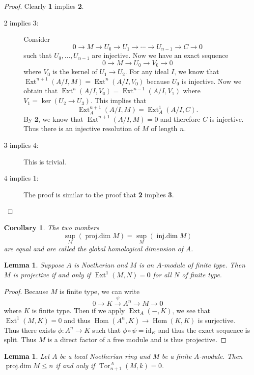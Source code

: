 \documentclass[leqno, openany]{memoir}
\newtheorem{cor}[thm]{Corollary}
\newtheorem{lem}[thm]{Lemma}
\theoremstyle{definition}
\theoremstyle{remark}
\theoremstyle{plain}
\theoremstyle{definition}
\theoremstyle{remark}
\newcommand{\mr}[1]{\mathrm{#1}}
\DeclareMathOperator{\Hom}{Hom}
\DeclareMathOperator{\Ext}{Ext}
\DeclareMathOperator{\Tor}{Tor}
\begin{document}
\begin{proof}
    Clearly \textbf{1} implies \textbf{2}.
    \begin{description}
        \item[2 implies 3:] Consider 
            \[ 0 \to M \to U_0 \to U_1 \to \cdots \to U_{n-1} \to C \to 0 \]
            such that $U_0, \ldots, U_{n-1}$ are injective. Now we have an exact sequence
            \[ 0 \to M \to U_0 \to V_0 \to 0 \]
            where $V_0$ is the kernel of $U_1 \to U_2$. For any ideal $I$, we know that $\Ext^{n+1}(A/I, M) = \Ext^n(A/I, V_0)$ because $U_0$ is injective. Now we obtain that $\Ext^n(A/I, V_0) = \Ext^{n-1}(A/I, V_1)$ where $V_1 = \ker (U_2 \to U_3)$. This implies that
            \[ \Ext_A^{n+1}(A/I, M) = \Ext_A^1(A/I, C). \]
            By \textbf{2}, we know that $\Ext^{n+1}(A/I, M) = 0$ and therefore $C$ is injective. Thus there is an injective resolution of $M$ of length $n$.
        \item[3 implies 4:] This is trivial.
        \item[4 implies 1:] The proof is similar to the proof that \textbf{2} implies \textbf{3}. \qedhere
    \end{description}
\end{proof}

\begin{cor}
    The two numbers
    \[ \sup_M( \operatorname{proj.dim} M ) = \sup_M (\operatorname{inj.dim} M) \]
    are equal and are called the \textit{global homological dimension} of $A$. 
\end{cor}

\begin{lem}
    Suppose $A$ is Noetherian and $M$ is an $A$-module of finite type. Then $M$ is projective if and only if $\Ext^1(M,N) = 0$ for all $N$ of finite type.
\end{lem}

\begin{proof}
    Because $M$ is finite type, we can write
    \[ 0 \to K \xrightarrow{\psi} A^n \to M \to 0 \]
    where $K$ is finite type. Then if we apply $\Ext_A(-,K)$, we see that $\Ext^1(M, K) = 0$ and thus $\Hom(A^n,K) \to \Hom(K,K)$ is surjective. Thus there exists $\phi \colon A^n \to K$ such that $\phi \circ \psi = \mr{id}_K$ and thus the exact sequence is split. Thus $M$ is a direct factor of a free module and is thus projective.
\end{proof}

\begin{lem}
    Let $A$ be a local Noetherian ring and $M$ be a finite $A$-module. Then $\operatorname{proj.dim} M \leq n$ if and only if $\Tor_{n+1}^A(M, k) = 0$.
\end{lem}
\end{document}
